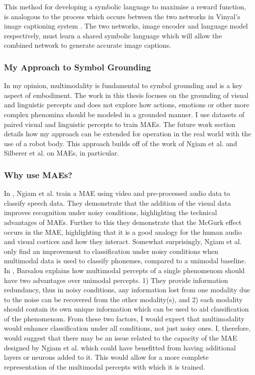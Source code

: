 This method for developing a symbolic language to maximise a reward function, is analogous to the process which occurs between the two networks in Vinyal's image captioning system \cite{vinyals2015show}.  The two networks, image encoder and language model respectively, must learn a shared symbolic language which will allow the combined network to generate accurate image captions.


\subsubsection{My Approach to Symbol Grounding}

In my opinion, multimodality is fundamental to symbol grounding and is a key aspect of embodiment. The work in this thesis focuses on the grounding of visual and linguistic percepts and does not explore how actions, emotions or other more complex phenomina should be modeled in a grounded manner. I use datasets of paired visual and linguistic percepts to train \acp{MAE}. The future work section details how my approach can be extended for operation in the real world with the use of a robot body. This approach builds off of the work of Ngiam et al. \cite{ngiam2011multimodal} and Silberer et al. \cite{silberer2014learning} on \acp{MAE}, in particular.

\subsubsection{Why use MAEs?}
In \cite{ngiam2011multimodal}, Ngiam et al. train a \ac{MAE} using video and pre-processed audio data to classify speech data. They demonstrate that the addition of the visual data improves recognition under noisy conditions, highlighting the technical advantages of \acp{MAE}. Further to this they demonstrate that the McGurk effect \cite{mcgurk1976hearing} occurs in the \ac{MAE}, highlighting that it is a good analogy for the human audio and visual cortices and how they interact.
Somewhat surprisingly, Ngiam et al. only find an improvement to classification under noisy conditions when multimodal data is used to classify phonemes, compared to a unimodal baseline. In \cite{barsalou2008grounded}, Barsalou explains how multimodal percepts of a single phenomenom should have two advantages over unimodal percepts. 1) They provide information redundancy, thus in noisy conditions, any information lost from one modality due to the noise can be recovered from the other modality(s), and 2) each modality should contain its own unique information which can be used to aid  classification of the phenomenom.
From these two factors, I would expect that multimodality would enhance classification under all conditions, not just noisy ones. I, therefore, would suggest that there may be an issue related to the capacity of the \ac{MAE} designed by Ngiam et al. which could have benefitted from having additional layers or neurons added to it. This would allow for a more complete representation of the multimodal percepts with which it is trained.

